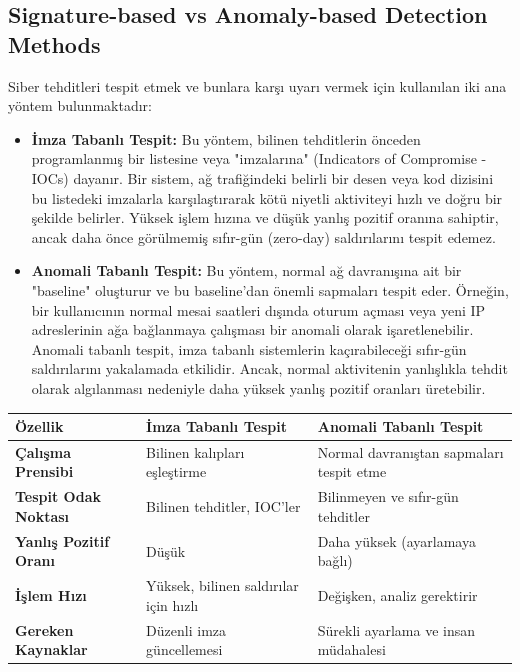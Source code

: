 \subsection{Signature-based vs Anomaly-based Detection Methods}

Siber tehditleri tespit etmek ve bunlara karşı uyarı vermek için kullanılan iki ana yöntem bulunmaktadır:


\begin{itemize}
\item \textbf{İmza Tabanlı Tespit:} Bu yöntem, bilinen tehditlerin önceden programlanmış bir listesine veya "imzalarına" (Indicators of Compromise - IOCs) dayanır. Bir sistem, ağ trafiğindeki belirli bir desen veya kod dizisini bu listedeki imzalarla karşılaştırarak kötü niyetli aktiviteyi hızlı ve doğru bir şekilde belirler. Yüksek işlem hızına ve düşük yanlış pozitif oranına sahiptir, ancak daha önce görülmemiş sıfır-gün (zero-day) saldırılarını tespit edemez.
\item \textbf{Anomali Tabanlı Tespit:} Bu yöntem, normal ağ davranışına ait bir "baseline" oluşturur ve bu baseline'dan önemli sapmaları tespit eder. Örneğin, bir kullanıcının normal mesai saatleri dışında oturum açması veya yeni IP adreslerinin ağa bağlanmaya çalışması bir anomali olarak işaretlenebilir. Anomali tabanlı tespit, imza tabanlı sistemlerin kaçırabileceği sıfır-gün saldırılarını yakalamada etkilidir. Ancak, normal aktivitenin yanlışlıkla tehdit olarak algılanması nedeniyle daha yüksek yanlış pozitif oranları üretebilir.
\end{itemize}

\begin{adjustbox}{max width=\textwidth}
\begin{tabularx}{\textwidth}{|l|X|X|}
\hline
\textbf{Özellik} & \textbf{İmza Tabanlı Tespit} & \textbf{Anomali Tabanlı Tespit} \\
\hline
\textbf{Çalışma Prensibi} & Bilinen kalıpları eşleştirme & Normal davranıştan sapmaları tespit etme \\
\hline
\textbf{Tespit Odak Noktası} & Bilinen tehditler, IOC'ler & Bilinmeyen ve sıfır-gün tehditler \\
\hline
\textbf{Yanlış Pozitif Oranı} & Düşük & Daha yüksek (ayarlamaya bağlı) \\
\hline
\textbf{İşlem Hızı} & Yüksek, bilinen saldırılar için hızlı & Değişken, analiz gerektirir \\
\hline
\textbf{Gereken Kaynaklar} & Düzenli imza güncellemesi & Sürekli ayarlama ve insan müdahalesi \\
\hline
\end{tabularx}
\end{adjustbox}



